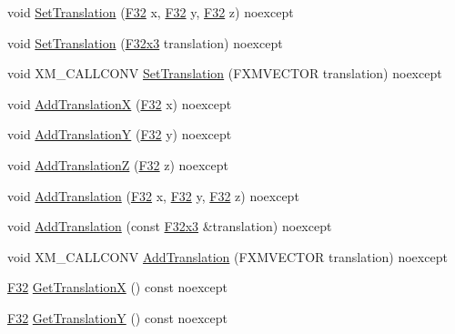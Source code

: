 \begin{DoxyCompactItemize}
\item 
void \hyperlink{classmage_1_1_transform_node_a9e6f9e70a52dae0dacaac15ccff42302}{Set\+Translation} (\hyperlink{namespacemage_aa97e833b45f06d60a0a9c4fc22ae02c0}{F32} x, \hyperlink{namespacemage_aa97e833b45f06d60a0a9c4fc22ae02c0}{F32} y, \hyperlink{namespacemage_aa97e833b45f06d60a0a9c4fc22ae02c0}{F32} z) noexcept
\item 
void \hyperlink{classmage_1_1_transform_node_a9d520de206120e1b17ac9eaf789a67d9}{Set\+Translation} (\hyperlink{namespacemage_a73fbe0da4b8d5bc156bb8453e5b63a17}{F32x3} translation) noexcept
\item 
void X\+M\+\_\+\+C\+A\+L\+L\+C\+O\+NV \hyperlink{classmage_1_1_transform_node_a958f614a6a534d26ac1d3eab3bea5ccb}{Set\+Translation} (F\+X\+M\+V\+E\+C\+T\+OR translation) noexcept
\item 
void \hyperlink{classmage_1_1_transform_node_afa141e560ed1a40080be42bc96cc21cc}{Add\+TranslationX} (\hyperlink{namespacemage_aa97e833b45f06d60a0a9c4fc22ae02c0}{F32} x) noexcept
\item 
void \hyperlink{classmage_1_1_transform_node_a0aed339bffcf6bffd1be495617b9f6d9}{Add\+TranslationY} (\hyperlink{namespacemage_aa97e833b45f06d60a0a9c4fc22ae02c0}{F32} y) noexcept
\item 
void \hyperlink{classmage_1_1_transform_node_a5baeb0e01284996939f5338c8d3fe2dc}{Add\+TranslationZ} (\hyperlink{namespacemage_aa97e833b45f06d60a0a9c4fc22ae02c0}{F32} z) noexcept
\item 
void \hyperlink{classmage_1_1_transform_node_a14c69b375da244d14e0f253ff217785d}{Add\+Translation} (\hyperlink{namespacemage_aa97e833b45f06d60a0a9c4fc22ae02c0}{F32} x, \hyperlink{namespacemage_aa97e833b45f06d60a0a9c4fc22ae02c0}{F32} y, \hyperlink{namespacemage_aa97e833b45f06d60a0a9c4fc22ae02c0}{F32} z) noexcept
\item 
void \hyperlink{classmage_1_1_transform_node_a4cdd6ab36bca8d6b1fdad61949e30160}{Add\+Translation} (const \hyperlink{namespacemage_a73fbe0da4b8d5bc156bb8453e5b63a17}{F32x3} \&translation) noexcept
\item 
void X\+M\+\_\+\+C\+A\+L\+L\+C\+O\+NV \hyperlink{classmage_1_1_transform_node_aa1241519dfcb8179d4564847e20c1c2c}{Add\+Translation} (F\+X\+M\+V\+E\+C\+T\+OR translation) noexcept
\item 
\hyperlink{namespacemage_aa97e833b45f06d60a0a9c4fc22ae02c0}{F32} \hyperlink{classmage_1_1_transform_node_a62d6ef7ab4fb3b9e550990655655ed5b}{Get\+TranslationX} () const noexcept
\item 
\hyperlink{namespacemage_aa97e833b45f06d60a0a9c4fc22ae02c0}{F32} \hyperlink{classmage_1_1_transform_node_aedabfc6152a5ad5775cbb10fec790b07}{Get\+TranslationY} () const noexcept

\end{DoxyCompactItemize}
